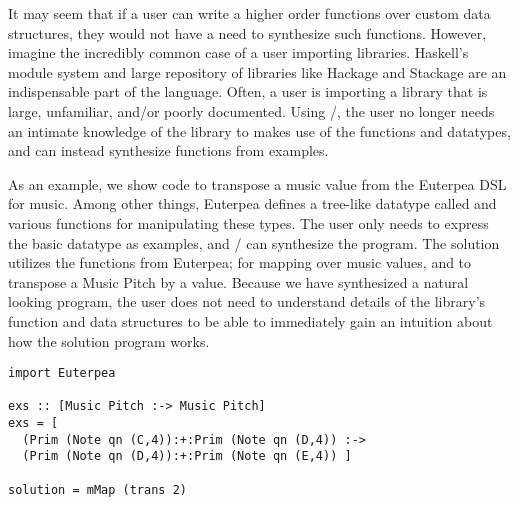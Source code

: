 It may seem that if a user can write a higher order functions over custom data structures, they would not have a need to synthesize such functions.
However, imagine the incredibly common case of a user importing libraries.
Haskell's module system and large repository of libraries like Hackage and Stackage are an indispensable part of the language\cite{hackage,stackage}.
Often, a user is importing a library that is large, unfamiliar, and/or poorly documented.
Using \ourTool/, the user no longer needs an intimate knowledge of the library to makes use of the functions and datatypes, and can instead synthesize functions from examples.

As an example, we show code to transpose a music value from the Euterpea DSL for music\cite{Euterpea}.
Among other things, Euterpea defines a tree-like datatype called  and various functions for manipulating these types.
The user only needs to express the basic datatype as examples, and \ourTool/ can synthesize the  program.
The solution utilizes the functions from Euterpea;  for mapping over music values, and  to transpose a Music Pitch by a value.
Because we have synthesized a natural looking program, the user does not need to understand details of the library's function and data structures to be able to immediately gain an intuition about how the solution program works.

\begin{lstlisting}
import Euterpea

exs :: [Music Pitch :-> Music Pitch]
exs = [
  (Prim (Note qn (C,4)):+:Prim (Note qn (D,4)) :->
  (Prim (Note qn (D,4)):+:Prim (Note qn (E,4)) ]
        
solution = mMap (trans 2)
\end{lstlisting}

